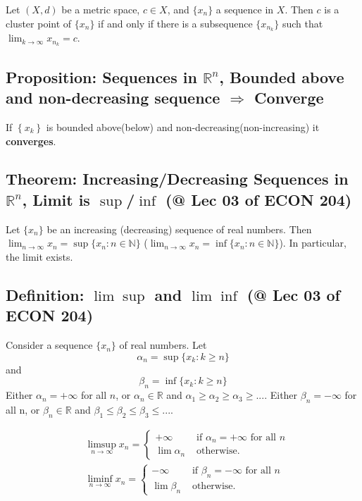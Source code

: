 \documentclass[11pt]{elegantbook}
\begin{document}
\begin{theorem}
    Let $(X, d)$ be a metric space, $c \in X$, and $\{x_n\}$ a sequence in $X$. Then $c$ is a cluster point of $\{x_n\}$ if and only if there is a subsequence $\{x_{n_k}\}$ such that $\lim_{k \rightarrow \infty} x_{n_k} = c$.
\end{theorem}

\subsection{Proposition: Sequences in $\mathbb{R}^n$, Bounded above and non-decreasing sequence $\Rightarrow$ Converge}
\begin{proposition}
    If $\left\{x_{k}\right\}$ is bounded above(below) and non-decreasing(non-increasing) it \textbf{converges}.
\end{proposition}

\subsection{Theorem: Increasing/Decreasing Sequences in $\mathbb{R}^n$, Limit is $\sup$/$\inf$ \small{(@ Lec 03 of ECON 204)}}

\begin{theorem}
    Let $\{x_n\}$ be an increasing (decreasing) sequence of real numbers. Then $\lim_{n \rightarrow \infty} x_n = \sup\{x_n : n \in \mathbb{N}\}$ ($\lim_{n \rightarrow \infty} x_n = \inf\{x_n : n \in \mathbb{N}\}$). In particular, the limit exists.
\end{theorem}

\subsection{Definition: $\lim\sup$ and $\lim\inf$ \small{(@ Lec 03 of ECON 204)}}
Consider a sequence $\{x_n\}$ of real numbers. Let $$\alpha_n=\sup\{x_k:k\geq n\}$$ and $$\beta_n=\inf\{x_k:k\geq n\}$$
Either $\alpha_n = +\infty$ for all $n$, or $\alpha_n \in \mathbb{R}$ and $\alpha_1 \geq \alpha_2 \geq \alpha_3 \geq...$. Either $\beta_n = -\infty$ for all n, or $\beta_n \in \mathbb{R}$ and $\beta_1 \leq \beta_2 \leq \beta_3 \leq ...$.
\begin{definition}
    \normalfont
    $$
    \begin{aligned}
    & \limsup _{n \rightarrow \infty} x_n=\left\{\begin{array}{cl}
    +\infty & \text { if } \alpha_n=+\infty \text { for all } n \\
    \lim \alpha_n & \text { otherwise. }
    \end{array}\right. \\
    & \liminf _{n \rightarrow \infty} x_n=\left\{\begin{array}{cl}
    -\infty & \text { if } \beta_n=-\infty \text { for all } n \\
    \lim \beta_n & \text { otherwise. }
    \end{array}\right.
    \end{aligned}
    $$
\end{definition}
\end{document}

